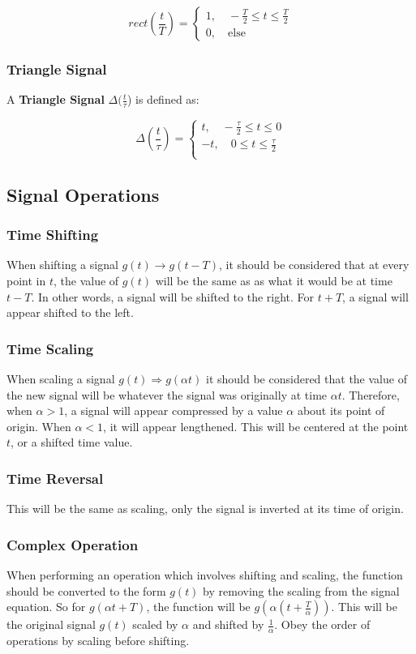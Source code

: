 \documentclass[11pt]{article}
\begin{document}
$$rect(\frac{t}{T}) = \begin{cases}
    1,\quad  -\frac{T}{2} \leq t \leq \frac{T}{2}\\
    0, \quad \text{else}
\end{cases}$$

\subsubsection{Triangle Signal}
A \textbf{Triangle Signal} $\Delta(\frac{t}{\tau}$) is defined as:

$$\Delta(\frac{t}{\tau}) = \begin{cases}
    t,   \quad   -\frac{\tau}{2} \leq t \leq 0 \\
    -t,   \quad  0 \leq t \leq \frac{\tau}{2} \\
\end{cases}$$

\subsection{Signal Operations}
\subsubsection{Time Shifting}

When shifting a signal $g(t) \rightarrow g(t - T)$, it should be considered that at every point in $t$, the value of $g(t)$ will be the same as as what it would be at time $t - T$. In other words, a signal will be shifted to the right. For $t + T$, a signal will appear shifted to the left.
\subsubsection{Time Scaling}

When scaling a signal $g(t) \Rightarrow g(\alpha t)$ it should be considered that the value of the new signal will be whatever the signal was originally at time $\alpha t$. Therefore, when $\alpha > 1$, a signal will appear compressed by a value $\alpha$ about its point of origin. When $\alpha < 1$, it will appear lengthened. This will be centered at the point $t$, or a shifted time value.
\subsubsection{Time Reversal}
This will be the same as scaling, only the signal is inverted at its time of origin.
\subsubsection{Complex Operation}
When performing an operation which involves shifting and scaling, the function should be converted to the form $g(t)$ by removing the scaling from the signal equation. So for $g(\alpha t + T)$, the function will be $g(\alpha(t + \frac{T}{\alpha}))$. This will be the original signal $g(t)$ scaled by $\alpha$ and shifted by $\frac{1}{\alpha}$. Obey the order of operations by scaling before shifting.
\end{document}
